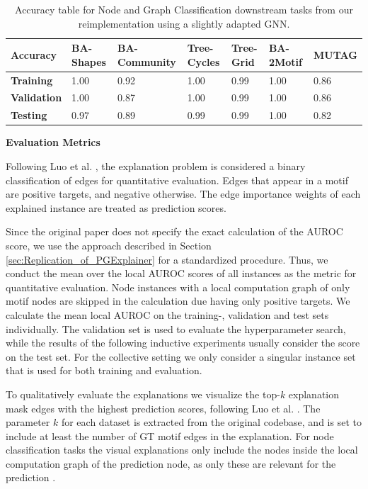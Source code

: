 \begin{table}[h]
    \centering
    \scriptsize
    \begin{tabularx}{\linewidth}{l|X X X X|X X}
    \hline
    \textbf{Accuracy} & \textbf{BA-Shapes} & \textbf{BA-Community} & \textbf{Tree-Cycles} & \textbf{Tree-Grid} & \textbf{BA-2Motif} & \textbf{MUTAG} \\
    \hline
    \textbf{Training}   & 1.00 & 0.92 & 1.00 & 0.99 & 1.00 & 0.86 \\
    \textbf{Validation} & 1.00 & 0.87 & 1.00 & 0.99 & 1.00 & 0.86 \\
    \textbf{Testing}    & 0.97 & 0.89 & 0.99 & 0.99 & 1.00 & 0.82 \\
    \hline
    \end{tabularx}
    \caption[Accuracies of adapted GNN downstream task]{Accuracy table for Node and Graph Classification downstream tasks from our reimplementation using a slightly adapted GNN.}
    \label{tab:our-dt-accuracy}
\end{table}
\newpage
\textbf{Evaluation Metrics}\par
Following Luo et al. \cite{luo2020parameterized}, the explanation problem is considered a binary classification of edges for quantitative evaluation. Edges that appear in a motif are positive targets, and negative otherwise. The edge importance weights of each explained instance are treated as prediction scores.

Since the original paper does not specify the exact calculation of the AUROC score, we use the approach described in Section \ref{sec:Replication_of_PGExplainer} for a standardized procedure. Thus, we conduct the mean over the local AUROC scores of all instances as the metric for quantitative evaluation. Node instances with a local computation graph of only motif nodes are skipped in the calculation due having only positive targets. We calculate the mean local AUROC on the training-, validation and test sets individually. The validation set is used to evaluate the hyperparameter search, while the results of the following inductive experiments usually consider the score on the test set. For the collective setting we only consider a singular instance set that is used for both training and evaluation. \bigskip

To qualitatively evaluate the explanations we visualize the top-$k$ explanation mask edges with the highest prediction scores, following Luo et al. \cite{luo2020parameterized}. The parameter $k$ for each dataset is extracted from the original codebase, and is set to include at least the number of \ac{GT} motif edges in the explanation. For node classification tasks the visual explanations only include the nodes inside the local computation graph of the prediction node, as only these are relevant for the prediction \cite{ying2019gnnexplainer}. \bigskip

